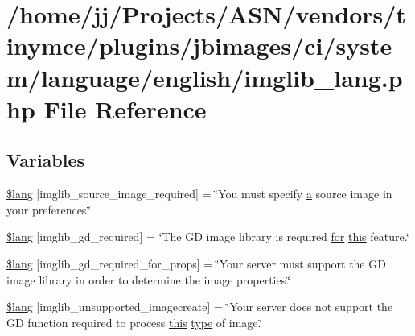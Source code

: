 \hypertarget{system_2language_2english_2imglib__lang_8php}{}\section{/home/jj/\+Projects/\+A\+S\+N/vendors/tinymce/plugins/jbimages/ci/system/language/english/imglib\+\_\+lang.php File Reference}
\label{system_2language_2english_2imglib__lang_8php}
\subsection*{Variables}
\begin{DoxyCompactItemize}
\item 
\hyperlink{system_2language_2english_2imglib__lang_8php_af48787ab142f633036ebdf1cc5da7409}{\$lang} \mbox{[}\textquotesingle{}imglib\+\_\+source\+\_\+image\+\_\+required\textquotesingle{}\mbox{]} = \char`\"{}You must specify \hyperlink{_chart_8min_8js_aef3b685c08bc6c76c8e729bd0e93901d}{a} source image in your preferences.\char`\"{}
\item 
\hyperlink{system_2language_2english_2imglib__lang_8php_aa8d7f8276e62fbe759daef2021c16552}{\$lang} \mbox{[}\textquotesingle{}imglib\+\_\+gd\+\_\+required\textquotesingle{}\mbox{]} = \char`\"{}The GD image library is required \hyperlink{jquery-ui_8min_8js_a75bc805cf26ad48d8e8a98f5af2c3e76}{for} \hyperlink{table_2plugin_8min_8js_a05c09a5e9d53fa7adf0a7936038c2fa3}{this} feature.\char`\"{}
\item 
\hyperlink{system_2language_2english_2imglib__lang_8php_a0da9c99f9e2b5f38ccbefb9d9f702c5e}{\$lang} \mbox{[}\textquotesingle{}imglib\+\_\+gd\+\_\+required\+\_\+for\+\_\+props\textquotesingle{}\mbox{]} = \char`\"{}Your server must support the GD image library in order to determine the image properties.\char`\"{}
\item 
\hyperlink{system_2language_2english_2imglib__lang_8php_ace032cbe8dafb1f3417a758d0914ecdb}{\$lang} \mbox{[}\textquotesingle{}imglib\+\_\+unsupported\+\_\+imagecreate\textquotesingle{}\mbox{]} = \char`\"{}Your server does not support the GD function required to process \hyperlink{table_2plugin_8min_8js_a05c09a5e9d53fa7adf0a7936038c2fa3}{this} \hyperlink{_ossn_wall_2actions_2wall_2post_2group_8php_a2dc1bb4e1ed0029daa81ac0776b14b51}{type} of image.\char`\"{}
\item 

\end{DoxyCompactItemize}
